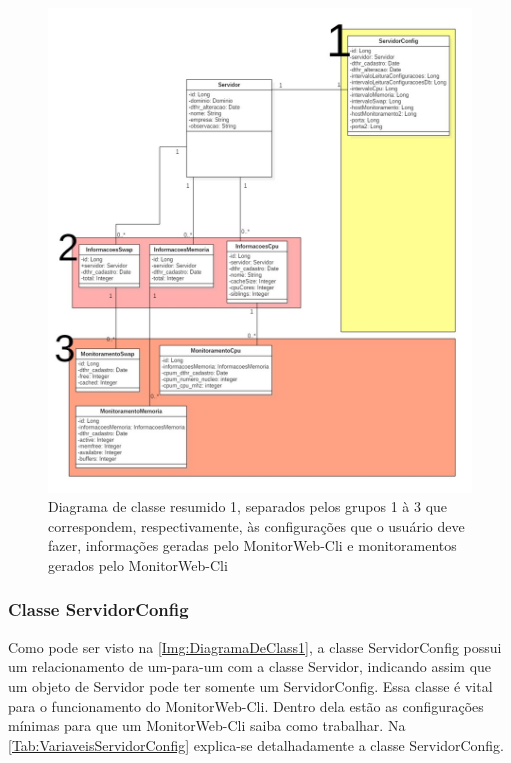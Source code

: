 \begin{figure}[H]
	\centering
	\includegraphics[width=1.0\textwidth]{figuras/DiagramaDeClass1.jpg}
	\caption[Diagrama de classe resumido 1.]{Diagrama de classe resumido 1, separados pelos grupos 1 à 3 que correspondem, respectivamente, às configurações que o usuário deve fazer, informações geradas pelo MonitorWeb-Cli e monitoramentos gerados pelo MonitorWeb-Cli}
	\label{Img:DiagramaDeClass1}
\end{figure}



\subsubsection{Classe ServidorConfig}
Como pode ser visto na \autoref{Img:DiagramaDeClass1}, a classe ServidorConfig possui um relacionamento de um-para-um com a classe Servidor, indicando assim que um objeto de Servidor pode ter somente um ServidorConfig. Essa classe é vital para o funcionamento do MonitorWeb-Cli. Dentro dela estão as configurações mínimas para que um MonitorWeb-Cli saiba como trabalhar. Na \autoref{Tab:VariaveisServidorConfig} explica-se detalhadamente a classe ServidorConfig.

